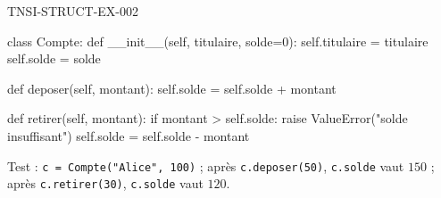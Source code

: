 \begin{corrige}{TNSI-STRUCT-EX-002}
\begin{python}
class Compte:
    def __init__(self, titulaire, solde=0):
        self.titulaire = titulaire
        self.solde = solde

    def deposer(self, montant):
        self.solde = self.solde + montant

    def retirer(self, montant):
        if montant > self.solde:
            raise ValueError("solde insuffisant")
        self.solde = self.solde - montant
\end{python}

Test : \lstinline{c = Compte("Alice", 100)} ; après \lstinline{c.deposer(50)}, \lstinline{c.solde} vaut $150$ ; après \lstinline{c.retirer(30)}, \lstinline{c.solde} vaut $120$.
\end{corrige}
